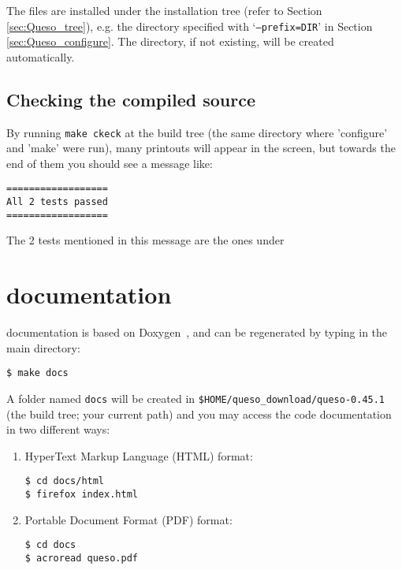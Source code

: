 The files are installed under the installation tree (refer to Section \ref{sec:Queso_tree}), e.g. the directory specified with `\texttt{--prefix=DIR}' in Section \ref{sec:Queso_configure}. The directory, if not existing, will be created automatically.%


\subsection{Checking the compiled source} \label{sc-checks}

By running \texttt{make ckeck} at the build tree (the same directory where 'configure' and 'make' were run), many printouts will appear in the screen, but towards the end of them you should see
a message like:
\begin{lstlisting}
==================
All 2 tests passed
==================
\end{lstlisting}

The 2 tests mentioned in this message are the ones under 


\section{\Queso{} documentation}\label{sec:Queso_docs}

\Queso{} documentation is  based on Doxygen~\cite{Doxygen}, and can be regenerated by typing in the main directory:
\begin{lstlisting}
$ make docs
\end{lstlisting}

A folder named \verb+docs+ will be created in \verb+$HOME/queso_download/queso-0.45.1+ (the build tree; your current path) and you may access the code documentation in two different ways:
\begin{enumerate}
\item HyperText Markup Language (HTML)  format:
\begin{verbatim}
$ cd docs/html
$ firefox index.html
\end{verbatim}

\item Portable Document Format (PDF) format:
\begin{verbatim}
$ cd docs
$ acroread queso.pdf
\end{verbatim}

\end{enumerate}

